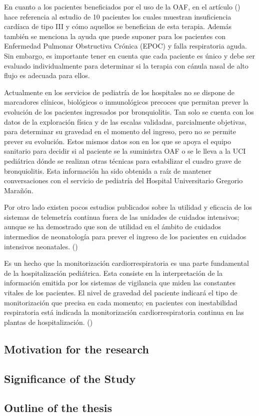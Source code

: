 En cuanto a los pacientes beneficiados por el uso de la OAF, en el artículo (\cite{Lodeserto2018}) hace referencia al estudio de 10 pacientes los cuales muestran insuficiencia cardíaca de tipo III y cómo aquellos se benefician de esta terapia. Además también se menciona la ayuda que puede suponer para los pacientes con Enfermedad Pulmonar Obstructiva Crónica (EPOC) y falla respiratoria aguda. Sin embargo, es importante tener en cuenta que cada paciente es único y debe ser evaluado individualmente para determinar si la terapia con cánula nasal de alto flujo es adecuada para ellos.

Actualmente en los servicios de pediatría de los hospitales no se dispone de marcadores clínicos, biológicos o inmunológicos precoces que permitan prever la evolución de los pacientes ingresados por bronquiolitis. Tan solo se cuenta con los datos de la exploración física y de las escalas validadas, parcialmente objetivas, para determinar su gravedad en el momento del ingreso, pero no se permite prever su evolución. Estos mismos datos son en los que se apoya el equipo sanitario para decidir si al paciente se la suministra OAF o se le lleva a la UCI pediátrica dónde se realizan otras técnicas para estabilizar el cuadro grave de bronquiolitis. Esta información ha sido obtenida a raíz de mantener conversaciones con el servicio de pediatría del Hospital Universitario Gregorio Marañón. 

Por otro lado existen pocos estudios publicados sobre la utilidad y eficacia de los sistemas de telemetría continua fuera de las unidades de cuidados intensivos; aunque se ha demostrado que son de utilidad en el ámbito de cuidados intermedios de neonatología para prever el ingreso de los pacientes en cuidados intensivos neonatales. (\cite{Solis2022})

Es un hecho que la monitorización cardiorrespiratoria es una parte fundamental de la hospitalización pediátrica. Esta consiste en la interpretación de la información emitida por los sistemas de vigilancia que miden las constantes vitales de los pacientes. El nivel de gravedad del paciente indicará el tipo de monitorización que precisa en cada momento; en pacientes con inestabilidad respiratoria está indicada la monitorización cardiorrespiratoria continua en las plantas de hospitalización. (\cite{AmandaC}) 

\subsection{Motivation for the research}

\subsection{Significance of the Study}


\subsection{Outline of the thesis}


